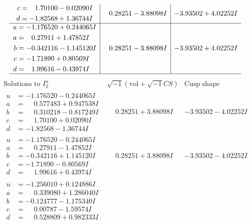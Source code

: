 \documentclass[1p]{elsarticle_modified}
\theoremstyle{definition}
\newcommand{\I}{\sqrt{-1}}
\begin{document}
$$\begin{array}{c|c|c}
\begin{aligned}
c &= \phantom{-}1.70100 - 0.02090 I \\
d &= -1.82568 + 1.36744 I\end{aligned}
 & \phantom{-}0.28251 - 3.88098 I & -3.93502 + 4.02252 I \\ \hline\begin{aligned}
u &= -1.176520 + 0.244065 I \\
a &= \phantom{-}0.27911 + 1.47852 I \\
b &= -0.342116 - 1.145120 I \\
c &= -1.71890 + 0.80569 I \\
d &= \phantom{-}1.99616 - 0.43974 I\end{aligned}
 & \phantom{-}0.28251 - 3.88098 I & -3.93502 + 4.02252 I\\
 \hline 
 \end{array}$$\newpage$$\begin{array}{c|c|c}  
\text{Solutions to }I^u_{2}& \I (\text{vol} + \sqrt{-1}CS) & \text{Cusp shape}\\
 \hline 
\begin{aligned}
u &= -1.176520 - 0.244065 I \\
a &= \phantom{-}0.577483 + 0.947538 I \\
b &= \phantom{-}0.310218 - 0.817249 I \\
c &= \phantom{-}1.70100 + 0.02090 I \\
d &= -1.82568 - 1.36744 I\end{aligned}
 & \phantom{-}0.28251 + 3.88098 I & -3.93502 - 4.02252 I \\ \hline\begin{aligned}
u &= -1.176520 - 0.244065 I \\
a &= \phantom{-}0.27911 - 1.47852 I \\
b &= -0.342116 + 1.145120 I \\
c &= -1.71890 - 0.80569 I \\
d &= \phantom{-}1.99616 + 0.43974 I\end{aligned}
 & \phantom{-}0.28251 + 3.88098 I & -3.93502 - 4.02252 I \\ \hline\begin{aligned}
u &= -1.256010 + 0.124886 I \\
a &= \phantom{-}0.339080 + 1.286040 I \\
b &= -0.124777 - 1.175340 I \\
c &= \phantom{-}0.00787 - 1.59574 I \\
d &= \phantom{-}0.528809 + 0.982333 I\end{aligned}

\end{array}$$
\end{document}
